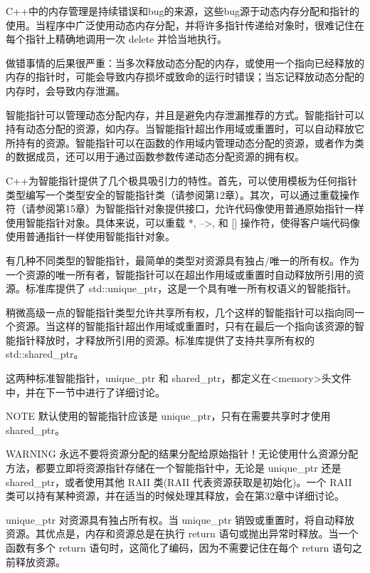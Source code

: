 
C++中的内存管理是持续错误和bug的来源，这些bug源于动态内存分配和指针的使用。当程序中广泛使用动态内存分配，并将许多指针传递给对象时，很难记住在每个指针上精确地调用一次 delete 并恰当地执行。

做错事情的后果很严重：当多次释放动态分配的内存，或使用一个指向已经释放的内存的指针时，可能会导致内存损坏或致命的运行时错误；当忘记释放动态分配的内存时，会导致内存泄漏。

智能指针可以管理动态分配内存，并且是避免内存泄漏推荐的方式。智能指针可以持有动态分配的资源，如内存。当智能指针超出作用域或重置时，可以自动释放它所持有的资源。智能指针可以在函数的作用域内管理动态分配的资源，或者作为类的数据成员，还可以用于通过函数参数传递动态分配资源的拥有权。

C++为智能指针提供了几个极具吸引力的特性。首先，可以使用模板为任何指针类型编写一个类型安全的智能指针类（请参阅第12章）。其次，可以通过重载操作符（请参阅第15章）为智能指针对象提供接口，允许代码像使用普通原始指针一样使用智能指针对象。具体来说，可以重载 *, –>, 和 [] 操作符，使得客户端代码像使用普通指针一样使用智能指针对象。

有几种不同类型的智能指针，最简单的类型对资源具有独占/唯一的所有权。作为一个资源的唯一所有者，智能指针可以在超出作用域或重置时自动释放所引用的资源。标准库提供了 std::unique\_ptr，这是一个具有唯一所有权语义的智能指针。

稍微高级一点的智能指针类型允许共享所有权，几个这样的智能指针可以指向同一个资源。当这样的智能指针超出作用域或重置时，只有在最后一个指向该资源的智能指针释放时，才释放所引用的资源。标准库提供了支持共享所有权的 std::shared\_ptr。

这两种标准智能指针，unique\_ptr 和 shared\_ptr，都定义在<memory>头文件中，并在下一节中进行了详细讨论。

\begin{myNotic}{NOTE}
默认使用的智能指针应该是 unique\_ptr，只有在需要共享时才使用 shared\_ptr。
\end{myNotic}

\begin{myWarning}{WARNING}
永远不要将资源分配的结果分配给原始指针！无论使用什么资源分配方法，都要立即将资源指针存储在一个智能指针中，无论是 unique\_ptr 还是 shared\_ptr，或者使用其他 RAII 类(RAII 代表资源获取是初始化)。一个 RAII 类可以持有某种资源，并在适当的时候处理其释放，会在第32章中详细讨论。
\end{myWarning}


unique\_ptr 对资源具有独占所有权。当 unique\_ptr 销毁或重置时，将自动释放资源。其优点是，内存和资源总是在执行 return 语句或抛出异常时释放。当一个函数有多个 return 语句时，这简化了编码，因为不需要记住在每个 return 语句之前释放资源。

